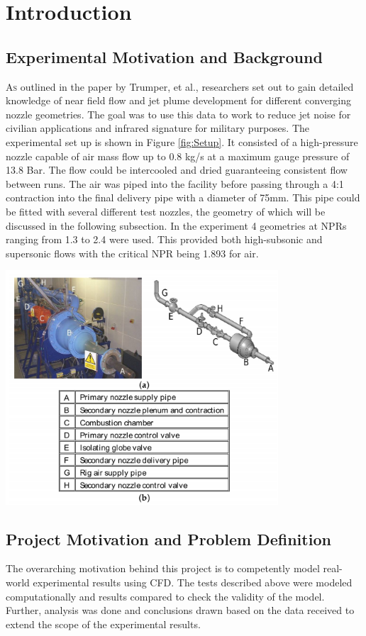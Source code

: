 \documentclass[12pt]{article} %
\begin{document}
\section{Introduction}
\subsection{Experimental Motivation and Background}
\lettrine{A}{s} outlined in the paper by Trumper, et al., researchers set out to gain detailed knowledge of near field flow and jet plume development for different converging nozzle geometries.\cite{MilesT.Trumper2018IoNE} The goal was to use this data to work to reduce jet noise for civilian applications and infrared signature for military purposes. The experimental set up is shown in Figure \ref{fig:Setup}. It consisted of a high-pressure nozzle capable of air mass flow up to 0.8 kg/s at a maximum gauge pressure of 13.8 Bar. The flow could be intercooled and dried guaranteeing consistent flow between runs. The air was piped into the facility before passing through a 4:1 contraction into the final delivery pipe with a diameter of 75mm. This pipe could be fitted with several different test nozzles, the geometry of which will be discussed in the following subsection. In the experiment 4 geometries at NPRs ranging from 1.3 to 2.4 were used. This provided both high-subsonic and supersonic flows with the critical NPR being 1.893 for air.

\begin{center}
    \includegraphics[width = 4in]{setup.PNG}
    \label{fig:Setup}
\end{center}

\subsection{Project Motivation and Problem Definition}
The overarching motivation behind this project is to competently model real-world experimental results using CFD. The tests described above were modeled computationally and results compared to check the validity of the model. Further, analysis was done and conclusions drawn based on the data received to extend the scope of the experimental results. 
\end{document}

